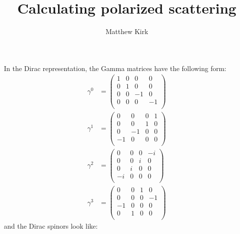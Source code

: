 \documentclass[a4paper,11pt]{article}
\author{Matthew Kirk}
\title{Calculating polarized scattering}
\numberwithin{equation}{section} %
\begin{document}
\maketitle



In the Dirac representation, the Gamma matrices have the following form:
\begin{align}
\gamma^0 &= \begin{pmatrix}
 1 & 0 & 0 & 0 \\
 0 & 1 & 0 & 0 \\
 0 & 0 & -1 & 0 \\
 0 & 0 & 0 & -1 \\
\end{pmatrix}
\\
\gamma^1 &= \begin{pmatrix}
 0 & 0 & 0 & 1 \\
 0 & 0 & 1 & 0 \\
 0 & -1 & 0 & 0 \\
 -1 & 0 & 0 & 0 \\
\end{pmatrix}
\\
\gamma^2 &= \begin{pmatrix}
 0 & 0 & 0 & -i \\
 0 & 0 & i & 0 \\
 0 & i & 0 & 0 \\
 -i & 0 & 0 & 0 \\
\end{pmatrix}
\\
\gamma^3 &= \begin{pmatrix}
 0 & 0 & 1 & 0 \\
 0 & 0 & 0 & -1 \\
 -1 & 0 & 0 & 0 \\
 0 & 1 & 0 & 0 \\
\end{pmatrix}
\end{align}
and the Dirac spinors look like:
\end{document}
